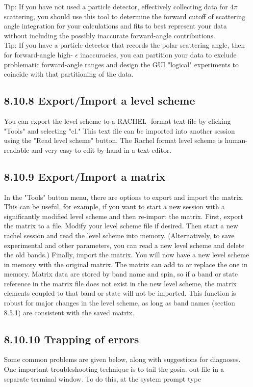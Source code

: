 \documentclass[10pt]{article}
\begin{document}
Tip: If you have not used a particle detector, effectively collecting data for $4 \pi$ scattering, you should use this tool to determine the forward cutoff of scattering angle integration for your calculations and fits to best represent your data without including the possibly inaccurate forward-angle contributions.\\
Tip: If you have a particle detector that records the polar scattering angle, then for forward-angle high- $\epsilon$ inaccuracies, you can partition your data to exclude problematic forward-angle ranges and design the GUI "logical" experiments to coincide with that partitioning of the data.

\subsection*{8.10.8 Export/Import a level scheme}
You can export the level scheme to a RACHEL -format text file by clicking "Tools" and selecting "el." This text file can be imported into another session using the "Read level scheme" button. The Rachel format level scheme is human-readable and very easy to edit by hand in a text editor.

\subsection*{8.10.9 Export/Import a matrix}
In the "Tools" button menu, there are options to export and import the matrix. This can be useful, for example, if you want to start a new session with a significantly modified level scheme and then re-import the matrix. First, export the matrix to a file. Modify your level scheme file if desired. Then start a new rachel session and read the level scheme into memory. (Alternatively, to save experimental and other parameters, you can read a new level scheme and delete the old bands.) Finally, import the matrix. You will now have a new level scheme in memory with the original matrix. The matrix can add to or replace the one in memory. Matrix data are stored by band name and spin, so if a band or state reference in the matrix file does not exist in the new level scheme, the matrix elements coupled to that band or state will not be imported. This function is robust for major changes in the level scheme, as long as band names (section 8.5.1) are consistent with the saved matrix.

\subsection*{8.10.10 Trapping of errors}
Some common problems are given below, along with suggestions for diagnoses. One important troubleshooting technique is to tail the gosia. out file in a separate terminal window. To do this, at the system prompt type
\end{document}
